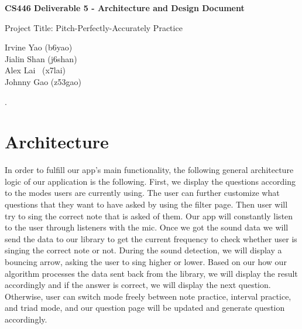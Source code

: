 \documentclass{article}
\begin{document}
\begin{titlepage}
   \vspace*{100px}
  \begin{center}

    \Large\textbf{CS446 Deliverable 5 - Architecture and Design Document}

   \vspace{50px}

    \Large{Project Title: Pitch-Perfectly-Accurately Practice}

   \vspace{50px}

    \large{Irvine Yao (b6yao)\\Jialin Shan (j6shan)\\Alex Lai \ (x7lai)\\Johnny Gao (z53gao)}

  \end{center}
\end{titlepage}
  
.


\section{Architecture}
\label{sec:architecture}
\qquad

In order to fulfill our app’s main functionality, the following general architecture logic of our application is the following. First, we display the questions according to the modes users are currently using. The user can further customize what questions that they want to have asked by using the filter page. Then user will try to sing the correct note that is asked of them. Our app will constantly listen to the user through listeners with the mic. Once we got the sound data we will send the data to our library to get the current frequency to check whether user is singing the correct note or not. During the sound detection, we will display a bouncing arrow, asking the user to sing higher or lower. Based on our how our algorithm processes the data sent back from the library, we will display the result accordingly and if the answer is correct, we will display the next question. Otherwise, user can switch mode freely between note practice, interval practice, and triad mode, and our question page will be updated and generate question accordingly. 
\end{document}
